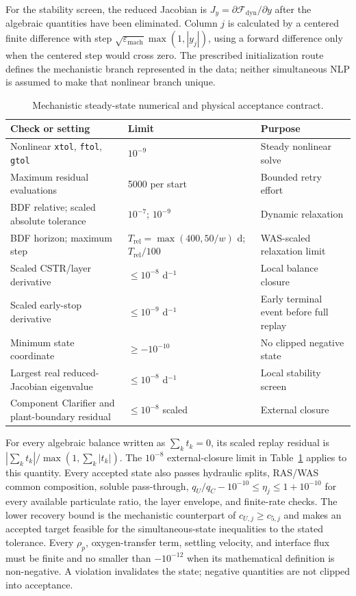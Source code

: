 \documentclass[a4paper,fleqn]{cas-sc}
\begin{document}
For the stability screen, the reduced Jacobian is $J_y=\partial\mathcal F_{\mathrm{dyn}}/\partial y$ after the algebraic quantities have been eliminated. Column $j$ is calculated by a centered finite difference with step $\sqrt{\varepsilon_{\mathrm{mach}}}\max(1,|y_j|)$, using a forward difference only when the centered step would cross zero. The prescribed initialization route defines the mechanistic branch represented in the data; neither simultaneous NLP is assumed to make that nonlinear branch unique.

\begin{table}[htbp]
\centering
\caption{Mechanistic steady-state numerical and physical acceptance contract.}
\label{tab:mechanistic_acceptance}
\scriptsize
\begin{tabular}{lll}
\toprule
Check or setting & Limit & Purpose \\
\midrule
Nonlinear \texttt{xtol}, \texttt{ftol}, \texttt{gtol} & $10^{-9}$ & Steady nonlinear solve \\
Maximum residual evaluations & 5000 per start & Bounded retry effort \\
BDF relative; scaled absolute tolerance & $10^{-7}$; $10^{-9}$ & Dynamic relaxation \\
BDF horizon; maximum step & $T_{\mathrm{rel}}=\max(400,50/w)$ d; $T_{\mathrm{rel}}/100$ & WAS-scaled relaxation limit \\
Scaled CSTR/layer derivative & $\leq10^{-8}$ d$^{-1}$ & Local balance closure \\
Scaled early-stop derivative & $\leq10^{-9}$ d$^{-1}$ & Early terminal event before full replay \\
Minimum state coordinate & $\geq-10^{-10}$ & No clipped negative state \\
Largest real reduced-Jacobian eigenvalue & $\leq10^{-8}$ d$^{-1}$ & Local stability screen \\
Component Clarifier and plant-boundary residual & $\leq10^{-8}$ scaled & External closure \\
\bottomrule
\end{tabular}
\end{table}
For every algebraic balance written as $\sum_k t_k=0$, its scaled replay residual is $|\sum_k t_k|/\max(1,\sum_k|t_k|)$. The $10^{-8}$ external-closure limit in Table~\ref{tab:mechanistic_acceptance} applies to this quantity. Every accepted state also passes hydraulic splits, RAS/WAS common composition, soluble pass-through, $q_U/q_C-10^{-10}\leq\eta_j\leq1+10^{-10}$ for every available particulate ratio, the layer envelope, and finite-rate checks. The lower recovery bound is the mechanistic counterpart of $c_{U,j}\geq c_{5,j}$ and makes an accepted target feasible for the simultaneous-state inequalities to the stated tolerance. Every $\rho_p$, oxygen-transfer term, settling velocity, and interface flux must be finite and no smaller than $-10^{-12}$ when its mathematical definition is non-negative. A violation invalidates the state; negative quantities are not clipped into acceptance.
\end{document}
